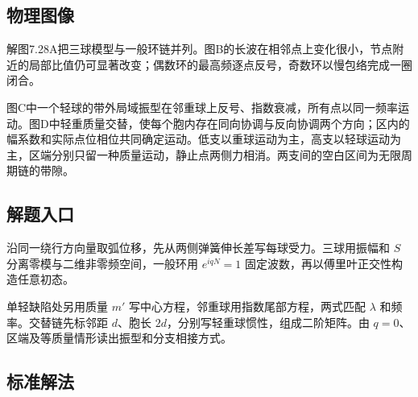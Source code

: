 \documentclass[UTF8,fontset=fandol,a4paper,11pt]{ctexart}
\begin{document}


\subsection*{物理图像}

解图7.28A把三球模型与一般环链并列。图B的长波在相邻点上变化很小，节点附近的局部比值仍可显著改变；偶数环的最高频逐点反号，奇数环以慢包络完成一圈闭合。

图C中一个轻球的带外局域振型在邻重球上反号、指数衰减，所有点以同一频率运动。图D中轻重质量交替，使每个胞内存在同向协调与反向协调两个方向；区内的幅系数和实际点位相位共同确定运动。低支以重球运动为主，高支以轻球运动为主，区端分别只留一种质量运动，静止点两侧力相消。两支间的空白区间为无限周期链的带隙。




\subsection*{解题入口}

沿同一绕行方向量取弧位移，先从两侧弹簧伸长差写每球受力。三球用振幅和 $S$ 分离零模与二维非零频空间，一般环用 $e^{iqN}=1$ 固定波数，再以傅里叶正交性构造任意初态。

单轻缺陷处另用质量 $m'$ 写中心方程，邻重球用指数尾部方程，两式匹配 $\lambda$ 和频率。交替链先标邻距 $d$、胞长 $2d$，分别写轻重球惯性，组成二阶矩阵。由 $q=0$、区端及等质量情形读出振型和分支相接方式。



\subsection*{标准解法}
\end{document}
